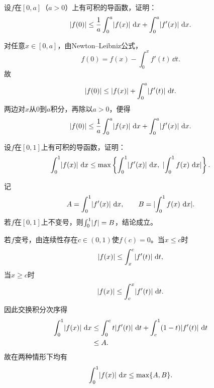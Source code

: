 \begin{xexercise}[2]
设$f$在$[0,a]$（$a>0$）上有可积的导函数，证明：
  \[
    \lvert f(0)\rvert\le\frac1a\int_0^a\lvert f(x)\rvert\,\mathop{}\!\mathrm{d} x+\int_0^a\lvert f'(x)\rvert\,\mathop{}\!\mathrm{d} x.
  \]
\end{xexercise}
\begin{xsolution}
对任意$x\in[0,a]$，由Newton--Leibniz公式，
\[
 f(0)=f(x)-\int_0^xf'(t)\,\dd t.
\]
故
\[
 \lvert f(0)\rvert\le\lvert f(x)\rvert+\int_0^a\lvert f'(t)\rvert\,\mathop{}\!\mathrm{d} t.
\]
两边对$x$从0到$a$积分，再除以$a>0$，便得
\[
 \lvert f(0)\rvert\le\frac1a\int_0^a\lvert f(x)\rvert\,\mathop{}\!\mathrm{d} x
 +\int_0^a\lvert f'(x)\rvert\,\mathop{}\!\mathrm{d} x.
\]
\end{xsolution}


\begin{xexercise}[3]
设$f$在$[0,1]$上有可积的导函数，证明：
  \[
    \int_0^1\lvert f(x)\rvert\,\mathop{}\!\mathrm{d} x\le\max\left\{\int_0^1\lvert f'(x)\rvert\,\mathop{}\!\mathrm{d} x,\ \lvert\int_0^1f(x)\,\mathop{}\!\mathrm{d} x\rvert\right\}.
  \]
\end{xexercise}
\begin{xsolution}
记
\[
 A=\int_0^1\lvert f'(x)\rvert\,\mathop{}\!\mathrm{d} x,
 \qquad
 B=\lvert\int_0^1f(x)\,\mathop{}\!\mathrm{d} x\rvert.
\]
若$f$在$[0,1]$上不变号，则$\int_0^1\lvert f\rvert=B$，结论成立。

若$f$变号，由连续性存在$c\in(0,1)$使$f(c)=0$。当$x\le c$时
\[
 \lvert f(x)\rvert\le\int_x^c\lvert f'(t)\rvert\,\mathop{}\!\mathrm{d} t,
\]
当$x\ge c$时
\[
 \lvert f(x)\rvert\le\int_c^x\lvert f'(t)\rvert\,\mathop{}\!\mathrm{d} t.
\]
因此交换积分次序得
\begin{align*}
\int_0^1\lvert f(x)\rvert\,\mathop{}\!\mathrm{d} x
&\le\int_0^ct\lvert f'(t)\rvert\,\mathop{}\!\mathrm{d} t
 +\int_c^1(1-t)\lvert f'(t)\rvert\,\mathop{}\!\mathrm{d} t\\
&\le A.
\end{align*}
故在两种情形下均有
\[
 \int_0^1\lvert f(x)\rvert\,\mathop{}\!\mathrm{d} x\le\max\{A,B\}.
\]
\end{xsolution}



